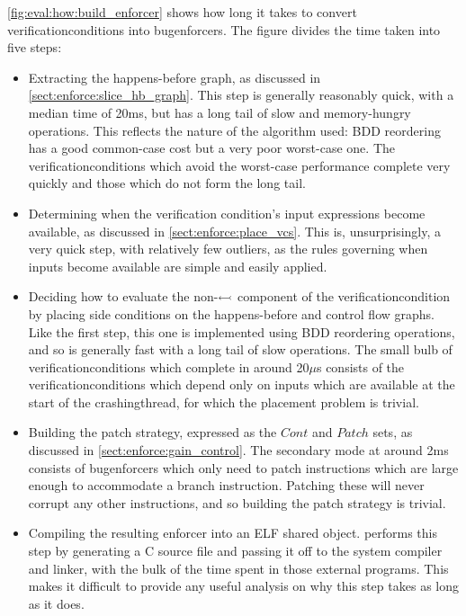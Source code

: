 \noindent
\autoref{fig:eval:how:build_enforcer} shows how long it takes to
convert \glspl{verificationcondition} into \glspl{bugenforcer}.  The
figure divides the time taken into five steps:
\begin{itemize}
\item Extracting the happens-before graph, as discussed in
  \autoref{sect:enforce:slice_hb_graph}.  This step is generally
  reasonably quick, with a median time of 20ms, but has a long tail of
  slow and memory-hungry operations.  This reflects the nature of the
  algorithm used: BDD reordering has a good common-case cost but a
  very poor worst-case one.  The \glspl{verificationcondition} which
  avoid the worst-case performance complete very quickly and those
  which do not form the long tail.
\item Determining when the verification condition's input expressions
  become available, as discussed in \autoref{sect:enforce:place_vcs}.
  This is, unsurprisingly, a very quick step, with relatively few
  outliers, as the rules governing when inputs become available are
  simple and easily applied.
\item Deciding how to evaluate the non-$\leftarrowtail$ component
  of the \gls{verificationcondition} by placing side conditions on the
  happens-before and control flow graphs.  Like the first step, this
  one is implemented using BDD reordering operations, and so is
  generally fast with a long tail of slow operations.  The small bulb
  of \glspl{verificationcondition} which complete in around 20$\mu$s
  consists of the \glspl{verificationcondition} which depend only on
  inputs which are available at the start of the \gls{crashingthread},
  for which the placement problem is trivial.
\item Building the patch strategy, expressed as the $\mathit{Cont}$
  and $\mathit{Patch}$ sets, as discussed in
  \autoref{sect:enforce:gain_control}.  The secondary mode at around
  2ms consists of \glspl{bugenforcer} which only need to patch
  instructions which are large enough to accommodate a branch
  instruction.  Patching these will never corrupt any other
  instructions, and so building the patch strategy is trivial.
\item Compiling the resulting enforcer into an ELF shared object.
  {\implementation} performs this step by generating a C source file
  and passing it off to the system compiler and linker, with the bulk
  of the time spent in those external programs.  This makes it
  difficult to provide any useful analysis on why this step takes as
  long as it does.
\end{itemize}
